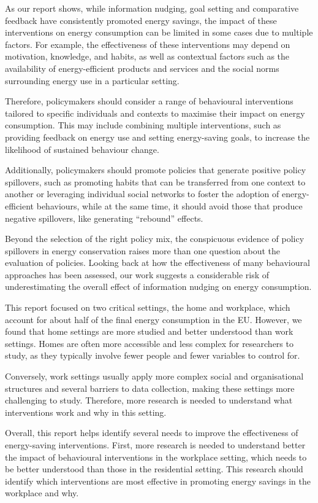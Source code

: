 \documentclass[
  11pt,
  captions=heading]{scrreport}
\begin{document}
As our report shows, while information nudging, goal setting and
comparative feedback have consistently promoted energy savings, the
impact of these interventions on energy consumption can be limited in
some cases due to multiple factors. For example, the effectiveness of
these interventions may depend on motivation, knowledge, and habits, as
well as contextual factors such as the availability of energy-efficient
products and services and the social norms surrounding energy use in a
particular setting.

Therefore, policymakers should consider a range of behavioural
interventions tailored to specific individuals and contexts to maximise
their impact on energy consumption. This may include combining multiple
interventions, such as providing feedback on energy use and setting
energy-saving goals, to increase the likelihood of sustained behaviour
change.

Additionally, policymakers should promote policies that generate
positive policy spillovers, such as promoting habits that can be
transferred from one context to another or leveraging individual social
networks to foster the adoption of energy-efficient behaviours, while at
the same time, it should avoid those that produce negative spillovers,
like generating ``rebound'' effects.

Beyond the selection of the right policy mix, the conspicuous evidence
of policy spillovers in energy conservation raises more than one
question about the evaluation of policies. Looking back at how the
effectiveness of many behavioural approaches has been assessed, our work
suggests a considerable risk of underestimating the overall effect of
information nudging on energy consumption.

This report focused on two critical settings, the home and workplace,
which account for about half of the final energy consumption in the EU.
However, we found that home settings are more studied and better
understood than work settings. Homes are often more accessible and less
complex for researchers to study, as they typically involve fewer people
and fewer variables to control for.

Conversely, work settings usually apply more complex social and
organisational structures and several barriers to data collection,
making these settings more challenging to study. Therefore, more
research is needed to understand what interventions work and why in this
setting.

Overall, this report helps identify several needs to improve the
effectiveness of energy-saving interventions. First, more research is
needed to understand better the impact of behavioural interventions in
the workplace setting, which needs to be better understood than those in
the residential setting. This research should identify which
interventions are most effective in promoting energy savings in the
workplace and why.
\end{document}
